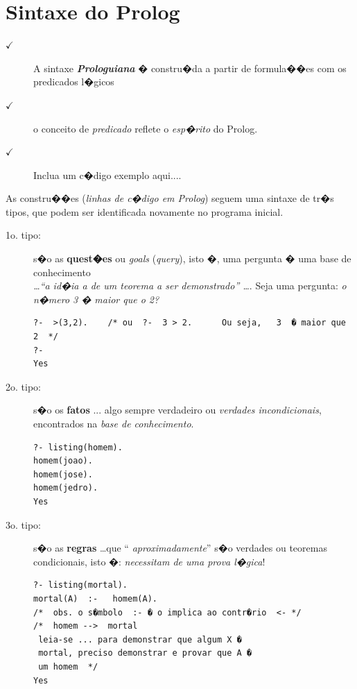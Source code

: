 \documentclass[final,a4paper]{article}
\begin{document}

\newpage
\section{Sintaxe do Prolog}

\begin{description}

\item [$\checkmark $] 
A sintaxe {\em {\bf Prologuiana}} � constru�da a partir de formula��es  com os predicados l�gicos

\item [$\checkmark $]  o conceito 
de {\it predicado} reflete o {\it esp�rito} do Prolog.

\item [$\checkmark $]  Inclua um c�digo exemplo aqui....

\end{description}

As constru��es ({\em linhas de c�digo em Prolog})
seguem uma sintaxe  de tr�s tipos, que podem 
ser identificada novamente no programa inicial.

\begin{description}
\item [1o. tipo:] s�o as {\bf quest�es} ou {\em goals} ({\em query}), isto
�, uma pergunta � uma base de conhecimento\\
          {\em \ldots  ``a id�ia  a de um teorema a ser demonstrado''
 \ldots}. Seja uma pergunta: {\em o n�mero 3 � maior que o 2?}
\begin{verbatim}
?-  >(3,2).    /* ou  ?-  3 > 2.      Ou seja,   3  � maior que 2  */
?-
Yes
\end{verbatim}
\item [2o. tipo:] s�o os  {\bf fatos}  ... algo sempre verdadeiro
ou  {\em  verdades incondicionais}, encontrados na {\em base de
conhecimento}.
\begin{verbatim}
?- listing(homem).
homem(joao).
homem(jose).
homem(jedro).
Yes
\end{verbatim}

\item [3o. tipo:] s�o as  {\bf regras} \ldots que\/  ``{\it
aproximadamente}'' s�o verdades ou teoremas condicionais, isto �:
{\em necessitam de uma prova l�gica}!

\begin{verbatim}
?- listing(mortal).
mortal(A)  :-   homem(A).
/*  obs. o s�mbolo  :- � o implica ao contr�rio  <- */
/*  homem -->  mortal
 leia-se ... para demonstrar que algum X �
 mortal, preciso demonstrar e provar que A �
 um homem  */
Yes
\end{verbatim}

\end{description}
\end{document}
